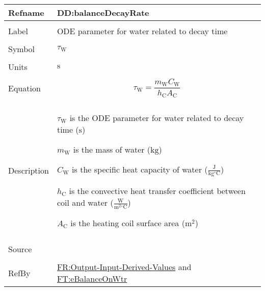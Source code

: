 \documentclass[12pt]{article}
\begin{document}
\vspace{\baselineskip}
\noindent
\begin{minipage}{\textwidth}
\begin{tabular}{>{\raggedright}p{}>{\raggedright\arraybackslash}p{}}
\toprule \textbf{Refname} & \textbf{DD:balanceDecayRate}
\label{DD:balanceDecayRate}
\\ \midrule \\
Label & ODE parameter for water related to decay time
        
\\ \midrule \\
Symbol & ${τ_{\text{W}}}$
         
\\ \midrule \\
Units & ${\text{s}}$
        
\\ \midrule \\
Equation & \begin{displaymath}
           {τ_{\text{W}}}=\frac{{m_{\text{W}}} {C_{\text{W}}}}{{h_{\text{C}}} {A_{\text{C}}}}
           \end{displaymath}
\\ \midrule \\
Description & \begin{symbDescription}
              \item{${τ_{\text{W}}}$ is the ODE parameter for water related to decay time (${\text{s}}$)}
              \item{${m_{\text{W}}}$ is the mass of water (${\text{kg}}$)}
              \item{${C_{\text{W}}}$ is the specific heat capacity of water ($\frac{\text{J}}{\text{kg}{}^{\circ}\text{C}}$)}
              \item{${h_{\text{C}}}$ is the convective heat transfer coefficient between coil and water ($\frac{\text{W}}{\text{m}^{2}{}^{\circ}\text{C}}$)}
              \item{${A_{\text{C}}}$ is the heating coil surface area (${\text{m}^{2}}$)}
              \end{symbDescription}
\\ \midrule \\
Source & \cite{koothoor2013}
         
\\ \midrule \\
RefBy & \hyperref[outputInputDerivVals]{FR:Output-Input-Derived-Values} and \hyperref[FT:eBalanceOnWtr]{FT:eBalanceOnWtr}
        
\\ \bottomrule
\end{tabular}
\end{minipage}
\end{document}
